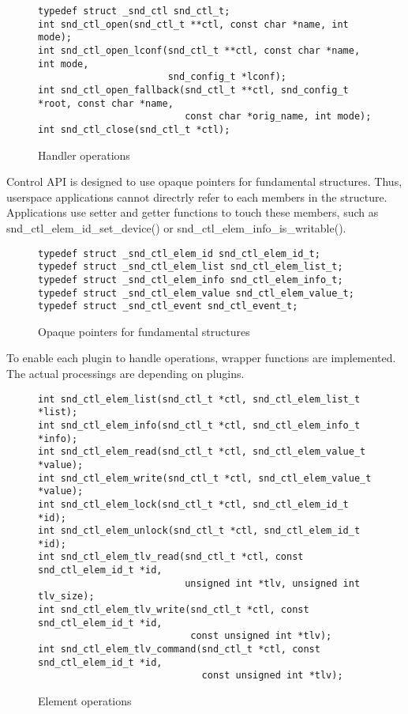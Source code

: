 \documentclass[onecolumn]{article}
\begin{document}
\begin{figure}[htbp]
\small
\begin{verbatim}
typedef struct _snd_ctl snd_ctl_t;
int snd_ctl_open(snd_ctl_t **ctl, const char *name, int mode);
int snd_ctl_open_lconf(snd_ctl_t **ctl, const char *name, int mode,
                       snd_config_t *lconf);
int snd_ctl_open_fallback(snd_ctl_t **ctl, snd_config_t *root, const char *name,
                          const char *orig_name, int mode);
int snd_ctl_close(snd_ctl_t *ctl);
\end{verbatim}
\caption{{Handler operations}}
\label{handler-operations}
\end{figure}

Control API is designed to use opaque pointers for fundamental structures. Thus, userspace applications cannot directrly refer to each members in the structure. Applications use setter and getter functions to touch these members, such as snd\_ctl\_elem\_id\_set\_device() or snd\_ctl\_elem\_info\_is\_writable().

\begin{figure}[htbp]
\small
\begin{verbatim}
typedef struct _snd_ctl_elem_id snd_ctl_elem_id_t;
typedef struct _snd_ctl_elem_list snd_ctl_elem_list_t;
typedef struct _snd_ctl_elem_info snd_ctl_elem_info_t;
typedef struct _snd_ctl_elem_value snd_ctl_elem_value_t;
typedef struct _snd_ctl_event snd_ctl_event_t;
\end{verbatim}
\caption{{Opaque pointers for fundamental structures}}
\label{fig:opaque-pointers}
\end{figure}

To enable each plugin to handle operations, wrapper functions are implemented. The actual processings are depending on plugins.

\begin{figure}[htbp]
\small
\begin{verbatim}
int snd_ctl_elem_list(snd_ctl_t *ctl, snd_ctl_elem_list_t *list);
int snd_ctl_elem_info(snd_ctl_t *ctl, snd_ctl_elem_info_t *info);
int snd_ctl_elem_read(snd_ctl_t *ctl, snd_ctl_elem_value_t *value);
int snd_ctl_elem_write(snd_ctl_t *ctl, snd_ctl_elem_value_t *value);
int snd_ctl_elem_lock(snd_ctl_t *ctl, snd_ctl_elem_id_t *id);
int snd_ctl_elem_unlock(snd_ctl_t *ctl, snd_ctl_elem_id_t *id);
int snd_ctl_elem_tlv_read(snd_ctl_t *ctl, const snd_ctl_elem_id_t *id,
                          unsigned int *tlv, unsigned int tlv_size);
int snd_ctl_elem_tlv_write(snd_ctl_t *ctl, const snd_ctl_elem_id_t *id,
                           const unsigned int *tlv);
int snd_ctl_elem_tlv_command(snd_ctl_t *ctl, const snd_ctl_elem_id_t *id,
                             const unsigned int *tlv);
\end{verbatim}
\caption{{Element operations}}
\label{fig:element-operations}
\end{figure}
\end{document}
